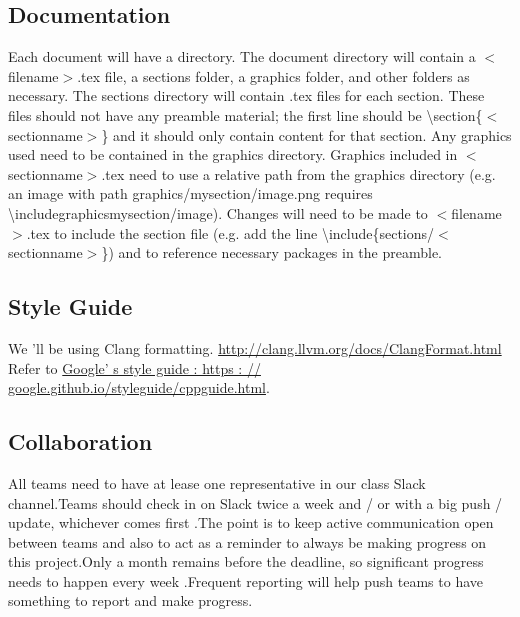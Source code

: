 \subsection*
{
  Documentation
}
Each document will have a directory. The document directory will contain a $<$filename$>$.tex file, a sections folder, a graphics folder, and other folders as necessary. The sections directory will contain .tex files for each section. These files should not have any preamble material; the first line should be \textbackslash section\{$<$sectionname$>$\} and it should only contain content for that section. Any graphics used need to be contained in the graphics directory. Graphics included in $<$sectionname$>$.tex need to use a relative path from the graphics directory (e.g. an image with path graphics/mysection/image.png requires \textbackslash includegraphics{mysection/image}). Changes will need to be made to $<$filename$>$.tex to include the section file (e.g. add the line \textbackslash include\{sections/$<$sectionname$>$\}) and to reference necessary packages in the preamble.
\subsection*
{
  Style Guide
}
We 'll be using Clang formatting. \href{http://clang.llvm.org/docs/ClangFormat.html}{http://clang.llvm.org/docs/ClangFormat.html} \\
Refer to \href{https://google.github.io/styleguide/cppguide.html}{Google' s
  style guide : https : // google.github.io/styleguide/cppguide.html}.
\subsection*
{
  Collaboration
}
All teams need to have at lease one representative in
      our class Slack channel.Teams should check in on Slack twice a week and /
  or with a big push / update,
  whichever comes first
    .The point is to keep active communication open between teams and also to
      act as a reminder to always be making progress on this project.Only a
        month remains before the deadline,
  so significant progress needs to happen every week
    .Frequent reporting will help push teams to have something to
      report and make progress.